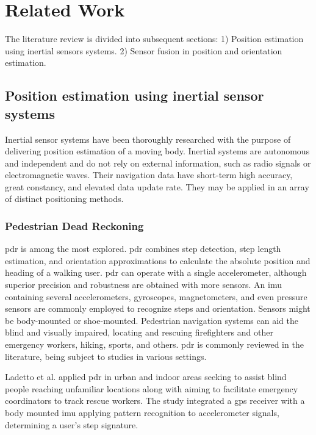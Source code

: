 \section{Related Work}
The literature review is divided into subsequent sections: 1) Position estimation using inertial sensors systems. 2) Sensor fusion in position and orientation estimation.

\subsection{Position estimation using inertial sensor systems}

Inertial sensor systems have been thoroughly researched with the purpose of delivering position estimation of a moving body. Inertial systems are autonomous and independent and do not rely on external information, such as radio signals or electromagnetic waves. Their navigation data have short-term high accuracy, great constancy, and elevated data update rate. They may be applied in an array of distinct positioning methods.

\subsubsection{Pedestrian Dead Reckoning}

\acrfull{pdr} is among the most explored. \acrshort{pdr} combines step detection, step length estimation, and orientation approximations to calculate the absolute position and heading of a walking user. \acrshort{pdr} can operate with a single accelerometer, although superior precision and robustness are obtained with more sensors. An \acrshort{imu} containing several accelerometers, gyroscopes, magnetometers, and even pressure sensors are commonly employed to recognize steps and orientation. Sensors might be body-mounted or shoe-mounted. Pedestrian navigation systems can aid the blind and visually impaired, locating and rescuing firefighters and other emergency workers, hiking, sports, and others. \acrshort{pdr} is commonly reviewed in the literature, being subject to studies in various settings.

Ladetto et al. \cite{ladetto2002step} applied \acrshort{pdr} in urban and indoor areas seeking to assist blind people reaching unfamiliar locations along with aiming to facilitate emergency coordinators to track rescue workers. The study integrated a \acrshort{gps} receiver with a body mounted \acrshort{imu} applying pattern recognition to accelerometer signals, determining a user's step signature.

